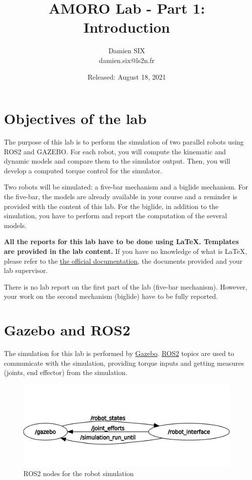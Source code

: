 \documentclass[a4paper]{article}
\title{AMORO Lab - Part 1: Introduction}
\author{Damien SIX \\ damien.six@ls2n.fr}
\date{Released: August 18, 2021}
\begin{document}
\maketitle

\section{Objectives of the lab}

The purpose of this lab is to perform the simulation of two parallel robots using ROS2 and GAZEBO. For each robot, you will compute the kinematic and dynamic models and compare them to the simulator output. Then, you will develop a computed torque control for the simulator.

Two robots will be simulated: a five-bar mechanism and a biglide mechanism. For the five-bar, the models are already available in your course and a reminder is provided with the content of this lab. For the biglide, in addition to the simulation, you have to perform and report the computation of the several models.

\textbf{All the reports for this lab have to be done using \LaTeX. Templates are provided in the lab content.}
If you have no knowledge of what is \LaTeX, please refer to the \href{https://www.latex-project.org/about/}{the official documentation}, the documents provided and your lab supervisor.

There is no lab report on the first part of the lab (five-bar mechanism). However, your work on the second mechanism (biglide) have to be fully reported. 

\section{Gazebo and ROS2}
The simulation for this lab is performed by \href{http://gazebosim.org/}{Gazebo}.  \href{https://docs.ros.org/en/foxy/index.html}{ROS2} topics are used to communicate with the simulation, providing torque inputs and getting measures (joints, end effector) from the simulation.

\begin{figure}
    \centering
    \includegraphics[width =\textwidth]{ros2_nodes.png}
    \caption{ROS2 nodes for the robot simulation}
    \label{fig:nodes}
\end{figure}
\end{document}
